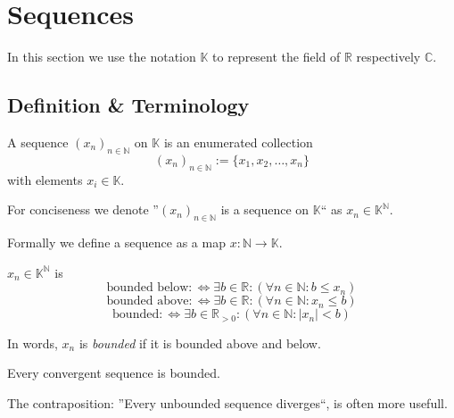 \section{Sequences}
In this section we use the notation \(\mathbb{K}\) to represent the field of \(\mathbb{R}\) respectively \(\mathbb{C}\).

\subsection{Definition \& Terminology}
\begin{definition}[Sequence]
   A sequence \((x_n)_{n \in \mathbb{N}}\) on \(\mathbb{K}\) is an enumerated collection
   \[(x_n)_{n \in \mathbb{N}} := \{x_1, x_2, \ldots, x_n\}\]
   with elements \(x_i \in \mathbb{K}\).
\end{definition}
\begin{remark}[Notation]
   For conciseness we denote ''\((x_n)_{n \in \mathbb{N}}\) is a sequence on \(\mathbb{K}\)`` as \(x_n \in \mathbb{K}^\mathbb{N}\).
\end{remark}
\begin{remark}
   Formally we define a sequence as a map \(x: \mathbb{N} \to \mathbb{K}\).
\end{remark}

\begin{definition}
   \(x_n \in \mathbb{K}^\mathbb{N}\) is
   \[\text{bounded below} :\iff \exists b \in \mathbb{R}: (\forall n \in \mathbb{N}: b \leq x_n)\]
   \[\text{bounded above} :\iff \exists b \in \mathbb{R}: (\forall n \in \mathbb{N}: x_n \leq b)\]
   \[\text{bounded} :\iff \exists b \in \mathbb{R}_{>0}: (\forall n \in \mathbb{N}: |x_n| < b)\]
\end{definition}
\begin{remark}
   In words, \(x_n\) is \emph{bounded} if it is bounded above and below.
\end{remark}

\begin{theorem}\label{thm:conv_bound}
   Every convergent sequence is bounded.
\end{theorem}
\begin{remark}
   The contraposition: ''Every unbounded sequence diverges``, is often more usefull.
\end{remark}

